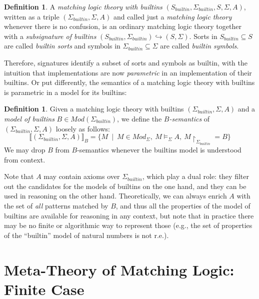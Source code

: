 \documentclass[UTF8,11pt]{article}
\newcounter{thmcounter}
\theoremstyle{plain}
\theoremstyle{definition}
\newtheorem{definition} [thmcounter]{Definition}
\theoremstyle{remark}
\newcommand{\Mod}{\textit{Mod}}
\newcommand{\denote}[1]{\llbracket{#1}\rrbracket}
\newcommand{\reduct}[2]{\mbox{${#1}\!\!\upharpoonright_{#2}$}}
\newcommand{\builtin}{\textit{builtin}}
\begin{document}
\begin{definition}
A \emph{matching logic theory with builtins}
$(S_\builtin,\Sigma_\builtin,S,\Sigma,A)$, written as a triple
$(\Sigma_\builtin,\Sigma,A)$ and
called just a \emph{matching logic theory} whenever there is no confusion,
is an ordinary matching logic theory together with a
\emph{subsignature of builtins}
$(S_\builtin,\Sigma_\builtin)\hookrightarrow(S,\Sigma)$.
Sorts in $S_\builtin \subseteq S$ are called \emph{builtin sorts} and symbols in
$\Sigma_\builtin \subseteq \Sigma$ are called \emph{builtin symbols}.
\end{definition}

Therefore, signatures identify a subset of sorts and symbols as builtin,
with the intuition that implementations are now \emph{parametric} in an
implementation of their builtins.
Or put differently, the semantics of a matching logic theory with builtins
is parametric in a model for its builtins:

\begin{definition}
Given a matching logic theory with builtins $(\Sigma_\builtin,\Sigma,A)$ and
a \emph{model of builtins} $B \in \Mod(\Sigma_\builtin)$, we define
the \emph{$B$-semantics} of $(\Sigma_\builtin,\Sigma,A)$ loosely as follows:
$$
\denote{(\Sigma_\builtin,\Sigma,A)}_B = 
\{M \ \mid \ M \in \Mod_{\Sigma},\ M \models_{\Sigma} A,\ \reduct{M}{\Sigma_\builtin} = B \}
$$
We may drop $B$ from $B$-semantics whenever the builtins model is
understood from context.
\end{definition}

Note that $A$ may contain axioms over $\Sigma_\builtin$, which play a dual
role: they filter out the candidates for the models of builtins on the one
hand, and they can be used in reasoning on the other hand.
Theoretically, we can always enrich $A$ with the set of \emph{all} patterns
matched by $B$, and thus all the properties of the model of builtins are
available for reasoning in any context, but note that in practice there may
be no finite or algorithmic way to represent those
(e.g., the set of properties of the ``builtin'' model of natural numbers is
not r.e.).


\section{Meta-Theory of Matching Logic: Finite Case}

\end{document}
